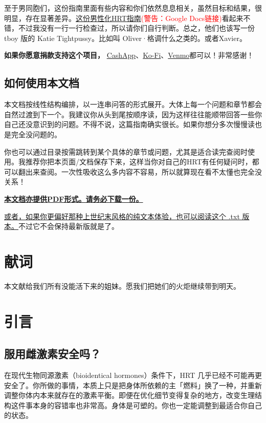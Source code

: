 \documentclass{article}
\begin{document}
至于男同胞们，这份指南里面有些内容和你们依然息息相关，虽然目标和结果，很明显，存在显著差异。\href{https://docs.google.com/document/d/1DXFxzN0XTudPZez\_SO61fpqncRLPH\_Be\_QG\_8Pcz9LU/edit?tab=t.0}{这份男性化HRT指南}\textcolor{red}{(警告：Google Docs链接)}看起来不错，不过我没有一行一行检查过，所以请你们自行判断。总之，他们也该写一份 tboy 版的 Katie Tightpussy。比如叫 Oliver·格调什么之类的。或者Xavier。

\textbf{如果你愿意捐款支持这个项目，} \href{https://cash.app/Katitties}{CashApp}、\href{https://ko-fi.com/katitties}{Ko-Fi}、\href{https://account.venmo.com/u/katitties}{Venmo}都可以！非常感谢！

\subsection*{如何使用本文档}

本文档按线性结构编排，以一连串问答的形式展开。大体上每一个问题和章节都会自然过渡到下一个。我建议你从头到尾按顺序读，因为这样往往能顺带回答一些你自己还没意识到的问题。不得不说，这篇指南确实很长。如果你想分多次慢慢读也是完全没问题的。

你也可以通过目录按需跳转到某个具体的章节或问题，尤其是适合读完查阅时使用。我推荐你把本页面/文档保存下来，这样当你对自己的HRT有任何疑问时，都可以翻出来查阅。一次性吸收这么多内容不容易，所以就算现在看不太懂也完全没关系！

\noindent\textbf{\href{PDF_LINK}{本文档亦提供PDF形式。请务必下载一份。}}

\noindent\href{https://pghrt.diy/pghrtgretchensversion.txt}{或者，如果你更偏好那种上世纪末风格的纯文本体验，也可以阅读这个 .txt 版本。}不过它不会保持最新版就是了。


\section*{献词}

本文献给我们所有没能活下来的姐妹。愿我们把她们的火炬继续带到明天。

\section{引言}

\subsection{服用雌激素安全吗？}

在现代生物同源激素（bioidentical hormones）条件下，HRT 几乎已经不可能再更安全了。你所做的事情，本质上只是把身体所依赖的主「燃料」换了一种，并重新调整你体内本来就存在的激素平衡。即便在优化细节变得复杂的地方，改变生理结构这件事本身的容错率也非常高。身体是可塑的。你也一定能调整到最适合你自己的状态。
\end{document}
